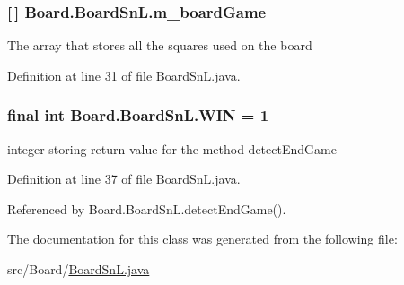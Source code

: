 \subsubsection[{m\+\_\+board\+Game}]{ \mbox{[}$\,$\mbox{]} Board.\+Board\+Sn\+L.\+m\+\_\+board\+Game\hspace{0.3cm}{\ttfamily [private]}}\label{class_board_1_1_board_sn_l_a98423adeb63e796de2d496689b4ce8e1}
The array that stores all the squares used on the board 

Definition at line 31 of file Board\+Sn\+L.\+java.

\hypertarget{class_board_1_1_board_sn_l_a9f3b27889e40b337a28438224a5fab4b}{}
\subsubsection[{W\+I\+N}]{\setlength{\rightskip}{0pt plus 5cm}final int Board.\+Board\+Sn\+L.\+W\+I\+N = 1\hspace{0.3cm}{\ttfamily [private]}}\label{class_board_1_1_board_sn_l_a9f3b27889e40b337a28438224a5fab4b}
integer storing return value for the method detect\+End\+Game 

Definition at line 37 of file Board\+Sn\+L.\+java.



Referenced by Board.\+Board\+Sn\+L.\+detect\+End\+Game().



The documentation for this class was generated from the following file\+:\begin{DoxyCompactItemize}
\item 
src/\+Board/\hyperlink{_board_sn_l_8java}{Board\+Sn\+L.\+java}\end{DoxyCompactItemize}
